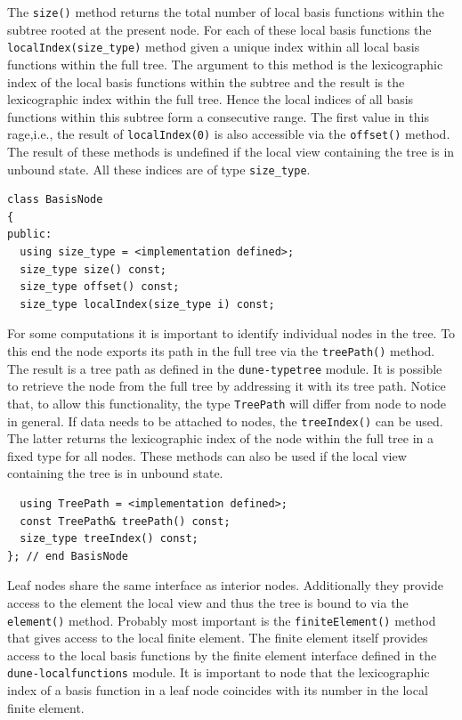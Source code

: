 \documentclass[a4paper,10pt,headings=normal,bibliography=totoc]{scrartcl}
\newcommand{\dunemodule}[1]{\texttt{#1}}
\begin{document}
The \texttt{size()} method returns the total number of
local basis functions within the subtree rooted at the
present node. For each of these local basis functions the
\texttt{localIndex(size\_type)} method given a unique
index within all local basis functions within the full
tree. The argument to this method is the lexicographic
index of the local basis functions within the subtree
and the result is the lexicographic index within the full
tree. Hence the local indices of all basis functions
within this subtree form a consecutive range. The first
value in this rage,i.e., the result of \texttt{localIndex(0)}
is also accessible via the \texttt{offset()} method.
The result of these methods is undefined if the
local view containing the tree is in unbound state.
All these indices are of type \texttt{size\_type}.

\begin{lstlisting}
class BasisNode
{
public:
  using size_type = <implementation defined>;
  size_type size() const;
  size_type offset() const;
  size_type localIndex(size_type i) const;
\end{lstlisting}

For some computations it is important to identify
individual nodes in the tree. To this end the node
exports its path in the full tree via the \texttt{treePath()}
method. The result is a tree path
as defined in the \dunemodule{dune-typetree} module.
It is possible to retrieve the node from the full
tree by addressing it with its tree path.
Notice that, to allow this functionality, the
type \texttt{TreePath} will differ from node to node
in general. If data needs to be attached to nodes,
the \texttt{treeIndex()} can be used. The latter returns
the lexicographic index of the node within the full
tree in a fixed type for all nodes.
These methods can also be used if the local view containing
the tree is in unbound state.

\begin{lstlisting}
  using TreePath = <implementation defined>;
  const TreePath& treePath() const;
  size_type treeIndex() const;
}; // end BasisNode
\end{lstlisting}

Leaf nodes share the same interface as interior
nodes. Additionally they provide access to the
element the local view and thus the tree is bound
to via the \texttt{element()} method. Probably most important
is the \texttt{finiteElement()} method that gives access
to the local finite element. The finite element
itself provides access to the local basis functions
by the finite element interface defined in the
\dunemodule{dune-localfunctions} module.
It is important to node that the lexicographic
index of a basis function in a leaf node coincides
with its number in the local finite element.
\end{document}
